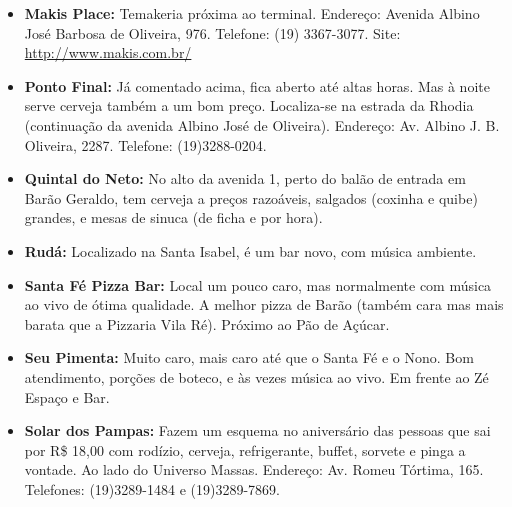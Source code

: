 \begin{itemize}
\item  \textbf{Makis Place:} Temakeria próxima ao terminal. Endereço: Avenida Albino José Barbosa de Oliveira, 976. Telefone: (19) 3367-3077. Site: \url{http://www.makis.com.br/}
\end{itemize}

\begin{itemize}
\item  \textbf{Ponto Final:} Já comentado acima, fica aberto até altas horas. Mas à noite serve cerveja também a um bom preço. Localiza-se na estrada da Rhodia (continuação da avenida Albino José de Oliveira). Endereço: Av. Albino J. B. Oliveira, 2287. Telefone: (19)3288-0204.
\end{itemize}

\begin{itemize}
\item  \textbf{Quintal do Neto:} No alto da avenida 1, perto do balão de entrada em Barão Geraldo, tem cerveja a preços razoáveis, salgados (coxinha e quibe) grandes, e mesas de sinuca (de ficha e por hora).
\end{itemize}

\begin{itemize}
\item  \textbf{Rudá:} Localizado na Santa Isabel, é um bar novo, com música ambiente.
\end{itemize}

\begin{itemize}
\item  \textbf{Santa Fé Pizza Bar:} Local um pouco caro, mas normalmente com música ao vivo de ótima qualidade. A melhor pizza de Barão (também cara mas mais barata que a Pizzaria Vila Ré). Próximo ao Pão de Açúcar.
\end{itemize}

\begin{itemize}
\item  \textbf{Seu Pimenta:} Muito caro, mais caro até que o Santa Fé e o Nono. Bom atendimento, porções de boteco, e às vezes música ao vivo. Em frente ao Zé Espaço e Bar.
\end{itemize}

\begin{itemize}
\item  \textbf{Solar dos Pampas:} Fazem um esquema no aniversário das pessoas que sai por R\$ 18,00 com rodízio, cerveja, refrigerante, buffet, sorvete e pinga a vontade. Ao lado do Universo Massas. Endereço: Av. Romeu Tórtima, 165. Telefones: (19)3289-1484 e (19)3289-7869.
\end{itemize}

